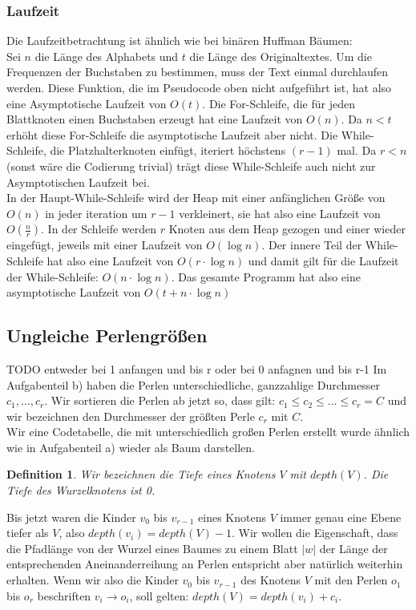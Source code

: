 \documentclass[a4paper,10pt,ngerman]{scrartcl}
\newtheorem{definition}[satz]{Definition}
\begin{document}
    \subsubsection{Laufzeit}
    Die Laufzeitbetrachtung ist ähnlich wie bei binären Huffman Bäumen:\\ %
    Sei $n$ die Länge des Alphabets und $t$ die Länge des Originaltextes.
    Um die Frequenzen der Buchstaben zu bestimmen, muss der Text einmal durchlaufen werden.
    Diese Funktion, die im Pseudocode oben nicht aufgeführt ist, hat also eine Asymptotische Laufzeit von $O(t)$.
    Die For-Schleife, die für jeden Blattknoten einen Buchstaben erzeugt hat eine Laufzeit von $O(n)$. Da $n < t$ erhöht diese For-Schleife die asymptotische Laufzeit aber nicht.
    Die While-Schleife, die Platzhalterknoten einfügt, iteriert höchstens $(r-1)$ mal. Da $r < n$ (sonst wäre die Codierung trivial) trägt diese While-Schleife auch nicht zur Asymptotischen Laufzeit bei.\\
    In der Haupt-While-Schleife wird der Heap mit einer anfänglichen Größe von $O(n)$ in jeder iteration um $r-1$ verkleinert, sie hat also eine Laufzeit von $O(\frac n r)$.
    In der Schleife werden $r$ Knoten aus dem Heap gezogen und einer wieder eingefügt, jeweils mit einer Laufzeit von $O(\log n)$.
    Der innere Teil der While-Schleife hat also eine Laufzeit von $O(r \cdot \log n)$ und damit gilt für die Laufzeit der While-Schleife: $O(n \cdot \log n)$.
    Das gesamte Programm hat also eine asymptotische Laufzeit von $O(t + n \cdot \log n)$



    \subsection{Ungleiche Perlengrößen}
    TODO entweder bei 1 anfangen und bis r oder bei 0 anfagnen und bis r-1
    Im Aufgabenteil b) haben die Perlen unterschiedliche, ganzzahlige Durchmesser $c_1, \dots, c_r$. Wir sortieren die Perlen ab jetzt so, dass gilt: $c_1 \le c_2 \le \dots \le c_r = C$ und wir bezeichnen den Durchmesser der größten Perle $c_r$ mit $C$. \\
    Wir eine Codetabelle, die mit unterschiedlich großen Perlen erstellt wurde ähnlich wie in Aufgabenteil a) wieder als Baum darstellen.
    \begin{definition}
        Wir bezeichnen die Tiefe eines Knotens $V$ mit $depth(V)$. Die Tiefe des Wurzelknotens ist 0.
    \end{definition}
    Bis jetzt waren die Kinder $v_0$ bis $v_{r-1}$ eines Knotens $V$ immer genau eine Ebene tiefer als $V$, also $depth(v_i) = depth(V) - 1$.
    Wir wollen die Eigenschaft, dass die Pfadlänge von der Wurzel eines Baumes zu einem Blatt $|w|$ der Länge der entsprechenden Aneinanderreihung an Perlen entspricht aber natürlich weiterhin erhalten. Wenn wir also die Kinder $v_0$ bis $v_{r-1}$ des Knotens $V$ mit den Perlen $o_1$ bis $o_{r}$ beschriften $v_i \to o_i$, soll gelten: $depth(V) = depth(v_i) + c_i$.
\end{document}
